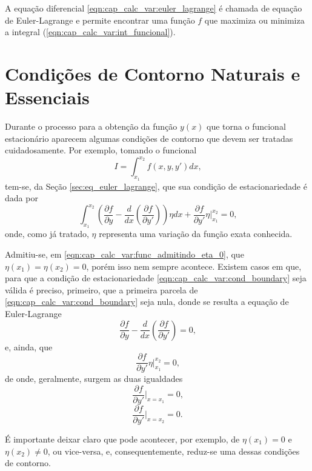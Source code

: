 \documentclass[
	12pt,				%
	openright,			%
    twoside,			%
	a4paper,			%
	english,			%
	french,				%
	spanish,			%
	brazil				%
	]{abntex2}
\numberwithin{lema}{chapter}
\numberwithin{teorema}{chapter}
\numberwithin{definicao}{chapter}
\numberwithin{exemplo}{chapter}
\numberwithin{figure}{chapter}
\begin{document}
A equação diferencial \eqref{eqn:cap_calc_var:euler_lagrange} é chamada de equação de Euler-Lagrange e permite encontrar uma função $f$ que maximiza ou minimiza a integral (\ref{eqn:cap_calc_var:int_funcional}).

\section{Condições de Contorno Naturais e Essenciais}
\label{sec:cond_contorno}

Durante o processo para a obtenção da função $y(x)$ que torna o funcional estacionário aparecem algumas condições de contorno que devem ser tratadas cuidadosamente. Por exemplo, tomando o funcional
$$
	I=\int_{x_1}^{x_2} f(x, y, y')dx
	\text{,}
$$
tem-se, da Seção \ref{sec:eq_euler_lagrange}, que sua condição de estacionariedade é dada por
\begin{equation}
	\label{eqn:cap_calc_var:cond_boundary}
	\int_{x_1}^{x_2} \left (
		\frac{\partial f}{\partial y}
		-
		\frac{d}{dx} \left (
			\frac{\partial f}{\partial y'}
		\right )
	\right ) \eta dx
	+
	\frac{\partial f}{\partial y'}\eta \Big |_{x_1}^{x_2} = 0
	\text{,}
\end{equation}
onde, como já tratado, $\eta$ representa uma variação da função exata conhecida.

Admitiu-se, em \eqref{eqn:cap_calc_var:func_admitindo_eta_0}, que $\eta(x_1)=\eta(x_2)=0$, porém isso nem sempre acontece. Existem casos em que, para que a condição de estacionariedade \eqref{eqn:cap_calc_var:cond_boundary} seja válida é preciso, primeiro, que a primeira parcela de \eqref{eqn:cap_calc_var:cond_boundary} seja nula, donde se resulta a equação de Euler-Lagrange
$$
	\frac{\partial f}{\partial y}
	-
	\frac{d}{dx}\left (
		\frac{\partial f}{\partial y'}
	\right )
	= 0
	\text{,}
$$
e, ainda, que
$$
	\frac{\partial f}{\partial y'}\eta \Big |_{x_1}^{x_2} = 0
	\text{,}
$$
de onde, geralmente, surgem as duas igualdades
\begin{equation}
	\label{eqn:cap_calc_var:condicao_natural_d1}
	\frac{\partial f}{\partial y'} \Big |_{x=x_1} = 0
	\text{,}
\end{equation}
\begin{equation}
	\label{eqn:cap_calc_var:condicao_natural_d2}
	\frac{\partial f}{\partial y'} \Big |_{x=x_2} = 0
	\text{.}
\end{equation}

É importante deixar claro que pode acontecer, por exemplo, de $\eta(x_1)=0$ e $\eta(x_2)\neq 0$, ou vice-versa, e, consequentemente, reduz-se uma dessas condições de contorno.
\end{document}
